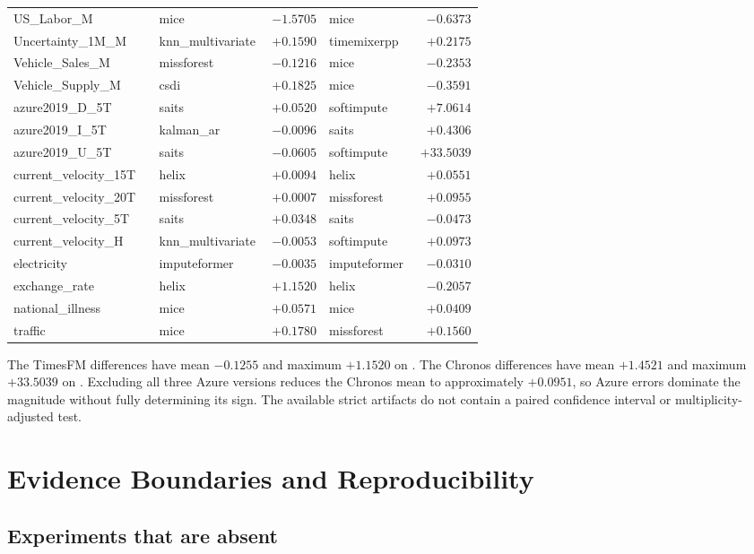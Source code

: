 \begin{longtable}{p{0.31\linewidth}p{0.15\linewidth}rp{0.15\linewidth}r}
US\_Labor\_M & mice & $-1.5705$ & mice & $-0.6373$ \\
Uncertainty\_1M\_M & knn\_multivariate & $+0.1590$ & timemixerpp & $+0.2175$ \\
Vehicle\_Sales\_M & missforest & $-0.1216$ & mice & $-0.2353$ \\
Vehicle\_Supply\_M & csdi & $+0.1825$ & mice & $-0.3591$ \\
azure2019\_D\_5T & saits & $+0.0520$ & softimpute & $+7.0614$ \\
azure2019\_I\_5T & kalman\_ar & $-0.0096$ & saits & $+0.4306$ \\
azure2019\_U\_5T & saits & $-0.0605$ & softimpute & $+33.5039$ \\
current\_velocity\_15T & helix & $+0.0094$ & helix & $+0.0551$ \\
current\_velocity\_20T & missforest & $+0.0007$ & missforest & $+0.0955$ \\
current\_velocity\_5T & saits & $+0.0348$ & saits & $-0.0473$ \\
current\_velocity\_H & knn\_multivariate & $-0.0053$ & softimpute & $+0.0973$ \\
electricity & imputeformer & $-0.0035$ & imputeformer & $-0.0310$ \\
exchange\_rate & helix & $+1.1520$ & helix & $-0.2057$ \\
national\_illness & mice & $+0.0571$ & mice & $+0.0409$ \\
traffic & mice & $+0.1780$ & missforest & $+0.1560$ \\
\end{longtable}
\normalsize

The TimesFM differences have mean $-0.1255$ and maximum $+1.1520$ on . The Chronos differences have mean $+1.4521$ and maximum $+33.5039$ on . Excluding all three Azure versions reduces the Chronos mean to approximately $+0.0951$, so Azure errors dominate the magnitude without fully determining its sign. The available strict artifacts do not contain a paired confidence interval or multiplicity-adjusted test.

\section{Evidence Boundaries and Reproducibility}
\label{app:reproducibility}

\subsection{Experiments that are absent}

